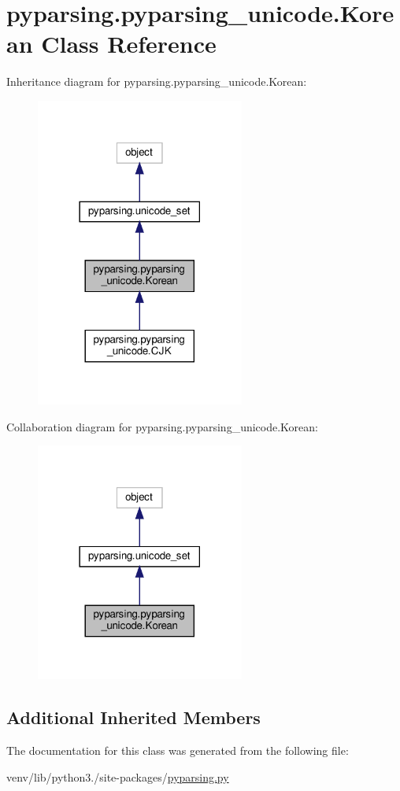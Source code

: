 \hypertarget{classpyparsing_1_1pyparsing__unicode_1_1Korean}{}\section{pyparsing.\+pyparsing\+\_\+unicode.\+Korean Class Reference}
\label{classpyparsing_1_1pyparsing__unicode_1_1Korean}


Inheritance diagram for pyparsing.\+pyparsing\+\_\+unicode.\+Korean\+:
\nopagebreak
\begin{figure}[H]
\begin{center}
\leavevmode
\includegraphics[width=194pt]{classpyparsing_1_1pyparsing__unicode_1_1Korean__inherit__graph}
\end{center}
\end{figure}


Collaboration diagram for pyparsing.\+pyparsing\+\_\+unicode.\+Korean\+:
\nopagebreak
\begin{figure}[H]
\begin{center}
\leavevmode
\includegraphics[width=194pt]{classpyparsing_1_1pyparsing__unicode_1_1Korean__coll__graph}
\end{center}
\end{figure}
\subsection*{Additional Inherited Members}


The documentation for this class was generated from the following file\+:\begin{DoxyCompactItemize}
\item 
venv/lib/python3./site-\/packages/\hyperlink{pyparsing_8py}{pyparsing.\+py}\end{DoxyCompactItemize}
